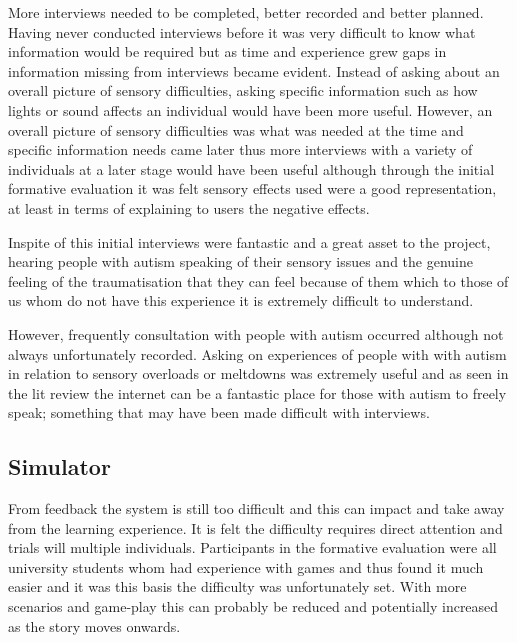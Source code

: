 \documentclass[11pt]{report}
\begin{document}
More interviews needed to be completed, better recorded and better planned. Having never conducted interviews before it was very difficult to know what information would be required but as time and experience grew gaps in information missing from interviews became evident. Instead of asking about an overall picture of sensory difficulties, asking specific information such as how lights or sound affects an individual would have been more useful. However, an overall picture of sensory difficulties was what was needed at the time and specific information needs came later thus more interviews with a variety of individuals at a later stage would have been useful although through the initial formative evaluation it was felt sensory effects used were a good representation, at least in terms of explaining to users the negative effects. 

Inspite of this initial interviews were fantastic and a great asset to the project, hearing people with autism speaking of their sensory issues and the genuine feeling of the traumatisation that they can feel because of them which to those of us whom do not have this experience it is extremely difficult to understand. 

However, frequently consultation with people with autism occurred although not always unfortunately recorded. Asking on experiences of people with with autism in relation to sensory overloads or meltdowns was extremely useful and as seen in the lit review the internet can be a fantastic place for those with autism to freely speak; something that may have been made difficult with interviews.



\subsection{Simulator}
From feedback the system is still too difficult and this can impact and take away from the learning experience. It is felt the difficulty requires direct attention and trials will multiple individuals. Participants in the formative evaluation were all university students whom had experience with games and thus found it much easier and it was this basis the difficulty was unfortunately set. With more scenarios and game-play this can probably be reduced and potentially increased as the story moves onwards.
 
\end{document}
